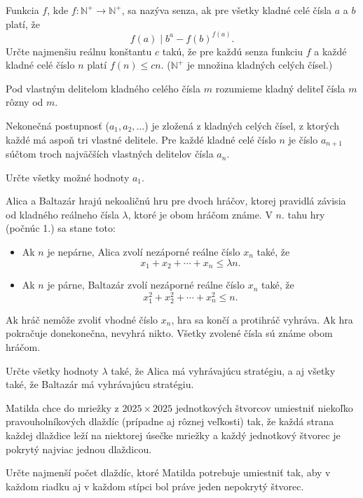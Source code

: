 {%
Funkcia $f$, kde $f: \mathbb{N}^{+} \rightarrow \mathbb{N}^{+}$, sa nazýva senza, ak pre všetky kladné celé čísla $a$ a $b$ platí, že
$$
f(a) \mid b^{a}-f(b)^{f(a)}.
$$
Určte najmenšiu reálnu konštantu $c$ takú, že pre každú senza funkciu $f$ a každé kladné celé číslo $n$ platí $f(n) \leqslant c n$.
($\mathbb{N}^{+}$ je množina kladných celých čísel.)
}

{%
Pod vlastným delitelom kladného celého čísla $m$ rozumieme kladný deliteľ čísla $m$ rôzny od $m$.

Nekonečná postupnosť ($a_{1}, a_{2}, \ldots$) je zložená z kladných celých čísel, z ktorých každé má aspoň tri vlastné delitele. Pre každé kladné celé číslo $n$ je číslo $a_{n+1}$ súčtom troch najväčších vlastných delitelov čísla $a_{n}$.

Určte všetky možné hodnoty $a_{1}$.
}

{%
Alica a Baltazár hrajú nekoaličnú hru pre dvoch hráčov, ktorej pravidlá závisia od kladného reálneho čísla $\lambda$, ktoré je obom hráčom známe. V $n$. tahu hry (počnúc 1.) sa stane toto:
\begin{itemize}
\item Ak $n$ je nepárne, Alica zvolí nezáporné reálne číslo $x_{n}$ také, že
$$
x_{1}+x_{2}+\cdots+x_{n} \leqslant \lambda n .
$$
\item Ak $n$ je párne, Baltazár zvolí nezáporné reálne číslo $x_{n}$ také, že
$$
x_{1}^{2}+x_{2}^{2}+\cdots+x_{n}^{2} \leqslant n .
$$
\end{itemize}
Ak hráč nemôže zvoliť vhodné číslo $x_{n}$, hra sa končí a protihráč vyhráva. Ak hra pokračuje donekonečna, nevyhrá nikto. Všetky zvolené čísla sú známe obom hráčom.

Určte všetky hodnoty $\lambda$ také, že Alica má vyhrávajúcu stratégiu, a aj všetky také, že Baltazár má vyhrávajúcu stratégiu.
}

{%
Matilda chce do mriežky z $2025 \times 2025$ jednotkových štvorcov umiestniť niekoľko pravouholníkových dlaždíc (prípadne aj rôznej veľkosti) tak, že každá strana každej dlaždice leží na niektorej úsečke mriežky a každý jednotkový štvorec je pokrytý najviac jednou dlaždicou.

Určte najmenší počet dlaždíc, ktoré Matilda potrebuje umiestniť tak, aby v každom riadku aj v každom stípci bol práve jeden nepokrytý štvorec.
}

{%
}
\podpis{}

